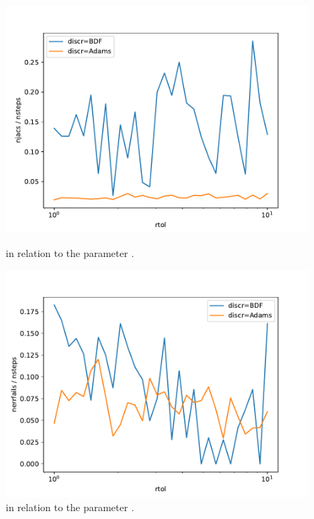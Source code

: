 \documentclass{report}
\begin{document}
\begin{figure}[h]
\centering
\begin{minipage}[b]{0.45\textwidth}
\centering
\includegraphics[width=\textwidth]{../Plots/Task4/Figure_311}
\caption{ in relation to the parameter .}
\label{pl:njacs_nsteps2}
\end{minipage}
\hfill
\begin{minipage}[b]{0.45\textwidth}
\centering
\includegraphics[width=\textwidth]{../Plots/Task4/Figure_312}
\caption{ in relation to the parameter .}
\label{pl:nerrfails_nsteps2}
\end{minipage}
\end{figure}
\end{document}
